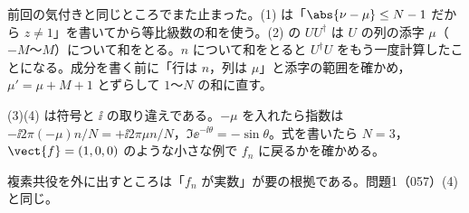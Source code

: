 \item {} 前回の気付きと同じところでまた止まった。(1) は「$\abs{\nu-\mu}\le N-1$ だから $z\neq1$」を書いてから等比級数の和を使う。(2) の $UU^{\dagger}$ は $U$ の列の添字 $\mu$（$-M$〜$M$）について和をとる。$n$ について和をとると $U^{\dagger}U$ をもう一度計算したことになる。成分を書く前に「行は $n$，列は $\mu$」と添字の範囲を確かめ，$\mu'=\mu+M+1$ とずらして $1$〜$N$ の和に直す。
\item (3)(4) は符号と $\ii$ の取り違えである。$-\mu$ を入れたら指数は $-\ii2\pi(-\mu)n/N=+\ii2\pi\mu n/N$，$\Im\ee^{-\ii\theta}=-\sin\theta$。式を書いたら $N=3$，$\vect{f}=(1,0,0)$ のような小さな例で $f_n$ に戻るかを確かめる。
\item 複素共役を外に出すところは「$f_n$ が実数」が要の根拠である。問題1（057）(4) と同じ。
